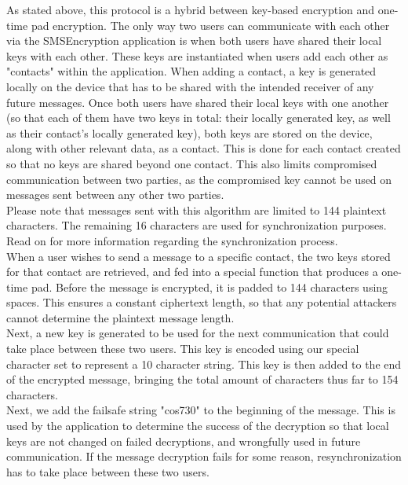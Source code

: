 As stated above, this protocol is a hybrid between key-based encryption and one-time pad encryption. The only way two users can communicate with each other via the SMSEncryption application is when both users have shared their local keys with each other. These keys are instantiated when users add each other as "contacts" within the application. When adding a contact, a key is generated locally on the device that has to be shared with the intended receiver of any future messages. Once both users have shared their local keys with one another (so that each of them have two keys in total: their locally generated key, as well as their contact's locally generated key), both keys are stored on the device, along with other relevant data, as a contact. This is done for each contact created so that no keys are shared beyond one contact. This also limits compromised communication between two parties, as the compromised key cannot be used on messages sent between any other two parties.
\vspace{10pt}\\
Please note that messages sent with this algorithm are limited to 144 plaintext characters. The remaining 16 characters are used for synchronization purposes. Read on for more information regarding the synchronization process.
\vspace{10pt}\\
When a user wishes to send a message to a specific contact, the two keys stored for that contact are retrieved, and fed into a special function that produces a one-time pad. Before the message is encrypted, it is padded to 144 characters using spaces. This ensures a constant ciphertext length, so that any potential attackers cannot determine the plaintext message length.
\vspace{10pt}\\
Next, a new key is generated to be used for the next communication that could take place between these two users. This key is encoded using our special character set to represent a 10 character string. This key is then added to the end of the encrypted message, bringing the total amount of characters thus far to 154 characters.
\vspace{10pt}\\
Next, we add the failsafe string "cos730" to the beginning of the message. This is used by the application to determine the success of the decryption so that local keys are not changed on failed decryptions, and wrongfully used in future communication. If the message decryption fails for some reason, resynchronization has to take place between these two users.
